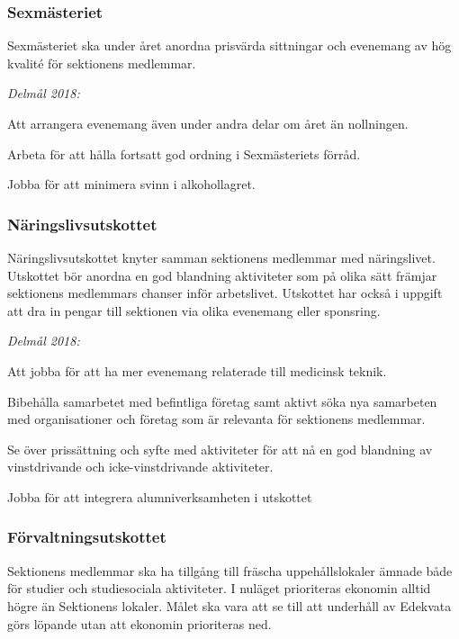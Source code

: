 \documentclass[../_main/handlingar.tex]{subfiles}
\begin{document}
\newpage

\subsubsection*{Sexmästeriet}
Sexmästeriet ska under året anordna prisvärda sittningar och evenemang av hög kvalité för sektionens medlemmar. 

\emph{Delmål 2018:}
\begin{dashlist}
    \item Att arrangera evenemang även under andra delar om året än nollningen. 
    \item Arbeta för att hålla fortsatt god ordning i Sexmästeriets förråd. 
    \item Jobba för att minimera svinn i alkohollagret.
\end{dashlist}

\subsubsection*{Näringslivsutskottet}
Näringslivsutskottet knyter samman sektionens medlemmar med näringslivet. Utskottet bör anordna en god blandning aktiviteter som på olika sätt främjar sektionens medlemmars chanser inför arbetslivet. Utskottet har också i uppgift att dra in pengar till sektionen via olika evenemang eller sponsring. 

\emph{Delmål 2018:}
\begin{dashlist}
    \item Att jobba för att ha mer evenemang relaterade till medicinsk teknik. 
    \item Bibehålla samarbetet med befintliga företag samt aktivt söka nya samarbeten med organisationer och företag som är relevanta för sektionens medlemmar. 
    \item Se över prissättning och syfte med aktiviteter för att nå en god blandning av vinstdrivande och icke-vinstdrivande aktiviteter.
    \item Jobba för att integrera alumniverksamheten i utskottet
\end{dashlist}

\subsubsection*{Förvaltningsutskottet}
Sektionens medlemmar ska ha tillgång till fräscha uppehållslokaler ämnade både för studier och studiesociala aktiviteter. I nuläget prioriteras ekonomin alltid högre än Sektionens lokaler. Målet ska vara att se till att underhåll av Edekvata görs löpande utan att ekonomin prioriteras ned. 
\end{document}
